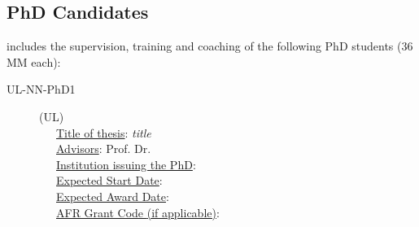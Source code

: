 \subsection{PhD Candidates}

\project includes the supervision, training and coaching of the following PhD
students (36 MM each):
\begin{description}
  \item[UL-NN-PhD1] (UL)\\ 
    ~~~\underline{Title of thesis}: \emph{title}\\
    ~~~\underline{Advisors}: Prof. Dr. \\
    ~~~\underline{Institution issuing the PhD}: \\
    ~~~\underline{Expected Start Date}: \\
    ~~~\underline{Expected Award Date}: \\
    ~~~\underline{AFR Grant Code {\tiny (if applicable)}}: \\
\end{description}





%
